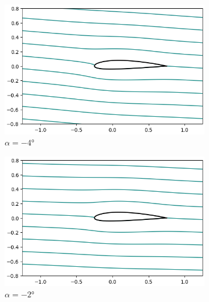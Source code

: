 \documentclass[letterpaper, openright, 12pt]{book}
\begin{document}
    \begin{figure}[htbp!]
        \centering
        \begin{subfigure}[c]{0.48\textwidth}
            \includegraphics[keepaspectratio, width=0.99\textwidth]
                {./img/potential_flow_2412_stream_-4}
            \caption{$\alpha = -4\si{\degree}$}
            \label{fig:potential_flow_2412_cp-4}
        \end{subfigure}
        \hfill
        \begin{subfigure}[c]{0.48\textwidth}
            \includegraphics[keepaspectratio, width=0.99\textwidth]
                {./img/potential_flow_2412_stream_-2}
            \caption{$\alpha = -2\si{\degree}$}
            \label{fig:potential_flow_2412_stream_-2}
        \end{subfigure}
        \begin{subfigure}[c]{0.48\textwidth}

\end{subfigure}
\end{figure}
\end{document}
